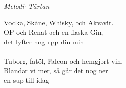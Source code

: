 {\footnotesize\textit{Melodi: Tårtan}}\par
\vspace{10pt}
Vodka, Skåne, Whisky, och Akvavit.\\
OP och Renat och en flaska Gin,\\
det lyfter nog upp din min.\\
\\
Tuborg, fatöl, Falcon och hemgjort vin.\\
Blandar vi mer, så går det nog ner\\
en sup till idag.
